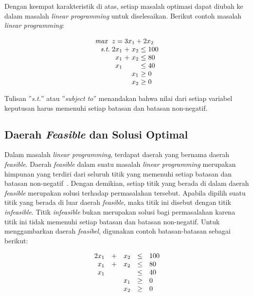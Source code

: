 Dengan keempat karakteristik di atas, setiap masalah optimasi dapat diubah ke dalam masalah \textit{linear programming} untuk diselesaikan. Berikut contoh masalah \textit{linear programming}:

\begin{equation*}
	\setlength\arraycolsep{1.5pt}
	\begin{array}{r r c r c l}
		\textit{max } &\multicolumn{5}{l}{z = 3x_1 + 2x_2}\\
		\textit{s.t.} &2x_1 &+ &x_2 &\leq &100\\
		&x_1 &+ &x_2 &\leq &80\\
		&x_1 &&&\leq &40\\
		&&&x_1 &\geq &0\\
		&&&x_2 &\geq &0\\
	\end{array}
\end{equation*}

	Tulisan ''\textit{s.t.}'' atau ''\textit{subject to}'' menandakan bahwa nilai dari setiap variabel keputusan harus memenuhi setiap batasan dan batasan non-negatif.

\subsection{Daerah \textit{Feasible} dan Solusi Optimal}
Dalam masalah \textit{linear programming}, terdapat daerah yang bernama daerah \textit{feasible}. Daerah \textit{feasible} dalam suatu masalah \textit{linear programming} merupakan himpunan yang terdiri dari seluruh titik yang memenuhi setiap batasan dan batasan non-negatif~\cite{winston2004operations}. Dengan demikian, setiap titik yang berada di dalam daerah \textit{feasible} merupakan solusi terhadap permasalahan tersebut. Apabila dipilih suatu titik yang berada di luar daerah \textit{feasible}, maka titik ini disebut dengan titik \textit{infeasible}. Titik \textit{infeasible} bukan merupakan solusi bagi permasalahan karena titik ini tidak memenuhi setiap batasan dan batasan non-negatif. Untuk menggambarkan daerah \textit{feasibel}, digunakan contoh batasan-batasan sebagai berikut:

\begin{equation*}
	\begin{array}{r c r c l}		
		2x_1 &+ &x_2 &\leq &100\\
		x_1 &+ &x_2 &\leq &80\\
		x_1 &&&\leq &40\\
		&&x_1 &\geq &0\\
		&&x_2 &\geq &0\\
	\end{array}
\end{equation*}


